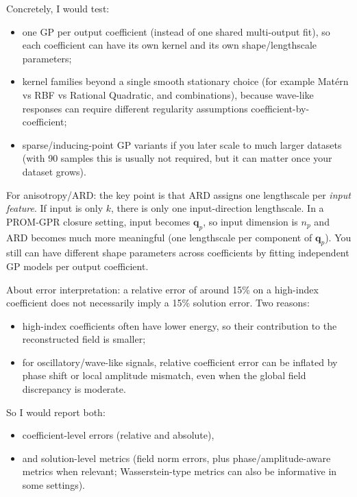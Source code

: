 \documentclass[11pt]{article}
\newcommand{\vect}[1]{\mathbf{#1}}
\begin{document}
Concretely, I would test:
\begin{itemize}[leftmargin=1.5em]
    \item one GP per output coefficient (instead of one shared multi-output fit), so each coefficient can have its own kernel and its own shape/lengthscale parameters;
    \item kernel families beyond a single smooth stationary choice (for example Mat\'ern vs RBF vs Rational Quadratic, and combinations), because wave-like responses can require different regularity assumptions coefficient-by-coefficient;
    \item sparse/inducing-point GP variants if you later scale to much larger datasets (with 90 samples this is usually not required, but it can matter once your dataset grows).
\end{itemize}

For anisotropy/ARD: the key point is that ARD assigns one lengthscale per \emph{input feature}. If input is only \(k\), there is only one input-direction lengthscale. In a PROM-GPR closure setting, input becomes \(\vect{q}_p\), so input dimension is \(n_p\) and ARD becomes much more meaningful (one lengthscale per component of \(\vect{q}_p\)). You still can have different shape parameters across coefficients by fitting independent GP models per output coefficient.

About error interpretation: a relative error of around 15\% on a high-index coefficient does not necessarily imply a 15\% solution error. Two reasons:
\begin{itemize}[leftmargin=1.5em]
    \item high-index coefficients often have lower energy, so their contribution to the reconstructed field is smaller;
    \item for oscillatory/wave-like signals, relative coefficient error can be inflated by phase shift or local amplitude mismatch, even when the global field discrepancy is moderate.
\end{itemize}

So I would report both:
\begin{itemize}[leftmargin=1.5em]
    \item coefficient-level errors (relative and absolute),
    \item and solution-level metrics (field norm errors, plus phase/amplitude-aware metrics when relevant; Wasserstein-type metrics can also be informative in some settings).
\end{itemize}
\end{document}
